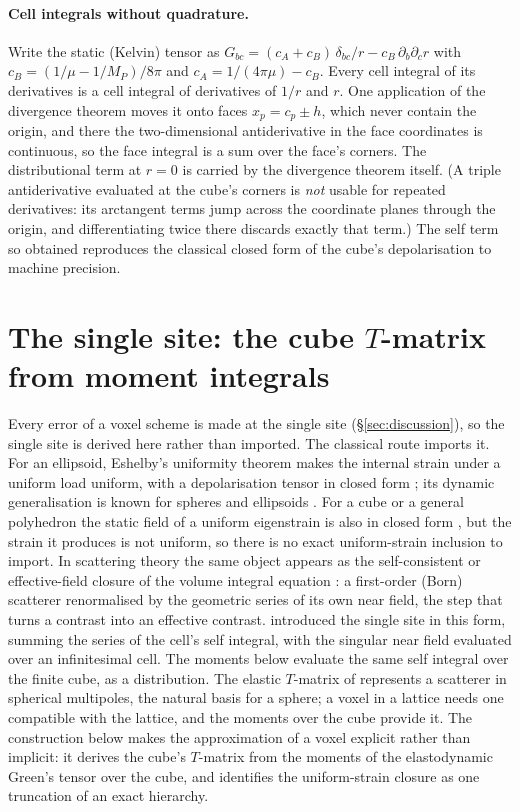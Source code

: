 \documentclass[extra,mreferee]{gji}
\providecommand{\texorpdfstring}[2]{#1}
\begin{document}
\paragraph{Cell integrals without quadrature.} Write the static (Kelvin) tensor as
$G_{bc}=(c_A+c_B)\,\delta_{bc}/r-c_B\,\partial_b\partial_c r$ with
$c_B=(1/\mu-1/M_P)/8\pi$ and $c_A=1/(4\pi\mu)-c_B$. Every cell integral of its derivatives is a cell
integral of derivatives of $1/r$ and $r$. One application of the divergence theorem moves it onto
faces $x_p=c_p\pm h$, which never contain the origin, and there the two-dimensional antiderivative in
the face coordinates is continuous, so the face integral is a sum over the face's corners. The
distributional term at $r=0$ is carried by the divergence theorem itself. (A triple antiderivative
evaluated at the cube's corners is \emph{not} usable for repeated derivatives: its arctangent terms
jump across the coordinate planes through the origin, and differentiating twice there discards
exactly that term.) The self term so obtained reproduces the classical closed form of the cube's
depolarisation to machine precision.

\section{The single site: the cube \texorpdfstring{$T$}{T}-matrix from moment integrals}\label{sec:single}

Every error of a voxel scheme is made at the single site (\S\ref{sec:discussion}), so the single
site is derived here rather than imported. The classical route imports it. For an ellipsoid,
Eshelby's uniformity theorem makes the internal strain under a uniform load uniform, with a
depolarisation tensor in closed form \citep{Eshelby1957,Eshelby1959,Mura1987}; its dynamic
generalisation is known for spheres and ellipsoids \citep{Mikata1990,Michelitsch2003}. For a cube
or a general polyhedron the static field of a uniform eigenstrain is also in closed form
\citep{Chiu1977,LeeJohnson1978,Rodin1996,Nozaki2001}, but the strain it produces is not uniform,
so there is no exact uniform-strain inclusion to import. In scattering theory the same object
appears as the self-consistent or effective-field closure of the volume integral equation
\citep{MalKnopoff1967,Gubernatis1977,Kanaun2008}: a first-order (Born) scatterer
\citep{Wu1985} renormalised by the geometric series of its own near field, the step that turns a
contrast into an effective contrast. \citet{Nestor1996} introduced the single site in this form,
summing the series of the cell's self integral, with the singular near field evaluated over an
infinitesimal cell. The moments below evaluate the same self integral over the finite cube, as a
distribution. The elastic $T$-matrix of \citet{Waterman1976} represents a
scatterer in spherical multipoles, the natural basis for a sphere; a voxel in a lattice needs one
compatible with the lattice, and the moments over the cube provide it. The construction below makes the
approximation of a voxel explicit rather than implicit: it derives the cube's $T$-matrix from
the moments of the elastodynamic Green's tensor over the cube, and identifies the
uniform-strain closure as one truncation of an exact hierarchy.
\end{document}
